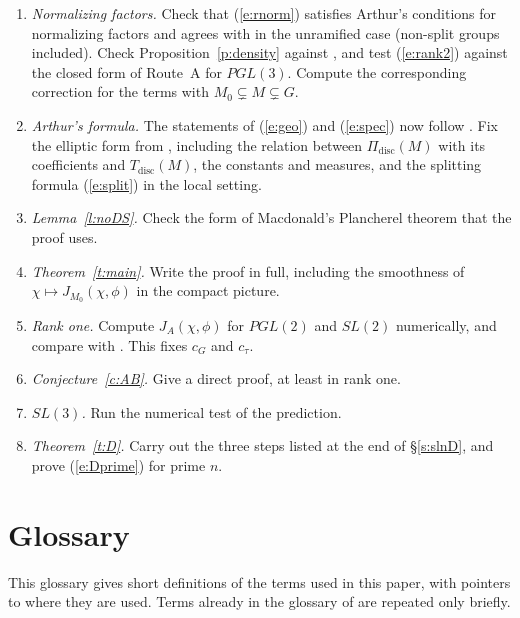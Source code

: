 \documentclass[12pt,letterpaper]{article}
\numberwithin{equation}{section}
\theoremstyle{plain}
\theoremstyle{definition}
\theoremstyle{remark}
\newcommand{\Tdisc}{T_{\mathrm{disc}}}
\begin{document}
\begin{enumerate}[label=(N\arabic*)]
\item\label{n:1} \emph{Normalizing factors.} Check that (\ref{e:rnorm}) satisfies Arthur's conditions for normalizing factors and agrees with \cite{Ar98} in the unramified case (non-split groups included). Check Proposition~\ref{p:density} against \cite{Ar81}, and test (\ref{e:rank2}) against the closed form of Route~A for $PGL(3)$. Compute the corresponding correction for the terms with $M_0\subsetneq M\subsetneq G$.
\item\label{n:2} \emph{Arthur's formula.} The statements of (\ref{e:geo}) and (\ref{e:spec}) now follow \cite[Thm.~12.2]{Ar91}. Fix the elliptic form from \cite{Ar93}, including the relation between $\Pi_{\mathrm{disc}}(M)$ with its coefficients and $\Tdisc(M)$, the constants and measures, and the splitting formula (\ref{e:split}) in the local setting.
\item\label{n:3} \emph{Lemma~\ref{l:noDS}.} Check the form of Macdonald's Plancherel theorem that the proof uses.
\item\label{n:4} \emph{Theorem~\ref{t:main}.} Write the proof in full, including the smoothness of $\chi\mapsto J_{M_0}(\chi,\phi)$ in the compact picture.
\item\label{n:5} \emph{Rank one.} Compute $J_A(\chi,\phi)$ for $PGL(2)$ and $SL(2)$ numerically, and compare with \cite[Thm.~6.1, Prop.~6.4]{JC26}. This fixes $c_G$ and $c_\tau$.
\item\label{n:6} \emph{Conjecture~\ref{c:AB}.} Give a direct proof, at least in rank one.
\item\label{n:7} \emph{$SL(3)$.} Run the numerical test of the prediction.
\item\label{n:8} \emph{Theorem~\ref{t:D}.} Carry out the three steps listed at the end of \S\ref{s:slnD}, and prove (\ref{e:Dprime}) for prime $n$.
\end{enumerate}

\appendix
\section{Glossary}\label{s:gloss}

This glossary gives short definitions of the terms used in this paper, with pointers to where they are used. Terms already in the glossary of \cite{JC26} are repeated only briefly.
\end{document}
